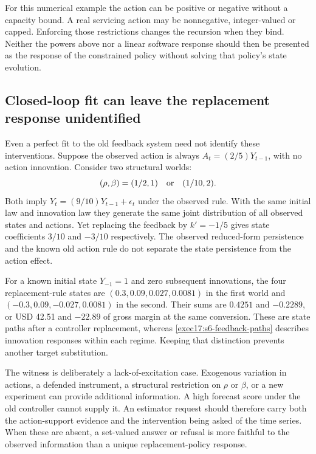 For this numerical example the action can be positive or negative without a
capacity bound. A real servicing action may be nonnegative, integer-valued or
capped. Enforcing those restrictions changes the recursion when they bind.
Neither the powers above nor a linear software response should then be
presented as the response of the constrained policy without solving that
policy's state evolution.

\subsection{Closed-loop fit can leave the replacement response unidentified}

Even a perfect fit to the old feedback system need not identify these
interventions. Suppose the observed action is always $A_t=(2/5)Y_{t-1}$,
with no action innovation. Consider two structural worlds:
\begin{equation}
 (\rho,\beta)=(1/2,1)\quad\hbox{or}\quad(1/10,2).
 \label{exec17:s6-two-worlds}
\end{equation}
Both imply $Y_t=(9/10)Y_{t-1}+\epsilon_t$ under the observed rule.
With the same initial law and innovation law they generate the same joint
distribution of all observed states and actions. Yet replacing the feedback
by $k'=-1/5$ gives state coefficients $3/10$ and $-3/10$ respectively.
The observed reduced-form persistence and the known old action rule do not
separate the state persistence from the action effect.

For a known initial state $Y_{-1}=1$ and zero subsequent innovations, the
four replacement-rule states are $(0.3,0.09,0.027,0.0081)$ in the first
world and $(-0.3,0.09,-0.027,0.0081)$ in the second. Their sums are
$0.4251$ and $-0.2289$, or USD 42.51 and $-22.89$ of gross margin at
the same conversion. These are state paths after a controller replacement,
whereas \eqref{exec17:s6-feedback-paths} describes innovation responses
within each regime. Keeping that distinction prevents another target
substitution.

The witness is deliberately a lack-of-excitation case. Exogenous variation
in actions, a defended instrument, a structural restriction on $\rho$ or
$\beta$, or a new experiment can provide additional information. A high
forecast score under the old controller cannot supply it. An estimator
request should therefore carry both the action-support evidence and the
intervention being asked of the time series. When these are absent, a
set-valued answer or refusal is more faithful to the observed information
than a unique replacement-policy response.

